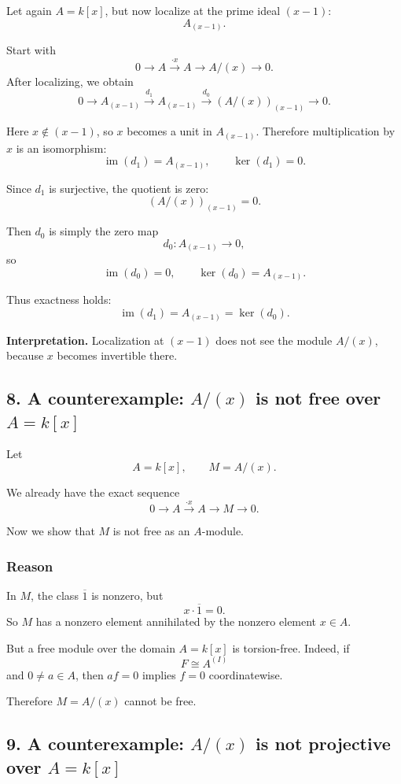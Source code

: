 \documentclass[12pt,a4paper]{article}
\theoremstyle{notespace}
\theoremstyle{definition}
\begin{document}
Let again \(A=k[x]\), but now localize at the prime ideal \((x-1)\):
\[
A_{(x-1)}.
\]

Start with
\[
0 \longrightarrow A \xrightarrow{\cdot x} A \longrightarrow A/(x) \longrightarrow 0.
\]
After localizing, we obtain
\[
0 \longrightarrow A_{(x-1)} \xrightarrow{d_1} A_{(x-1)} \xrightarrow{d_0} (A/(x))_{(x-1)} \longrightarrow 0.
\]

Here \(x\notin (x-1)\), so \(x\) becomes a unit in \(A_{(x-1)}\).
Therefore multiplication by \(x\) is an isomorphism:
\[
\operatorname{im}(d_1)=A_{(x-1)},
\qquad
\ker(d_1)=0.
\]

Since \(d_1\) is surjective, the quotient is zero:
\[
(A/(x))_{(x-1)}=0.
\]

Then \(d_0\) is simply the zero map
\[
d_0:A_{(x-1)}\to 0,
\]
so
\[
\operatorname{im}(d_0)=0,
\qquad
\ker(d_0)=A_{(x-1)}.
\]

Thus exactness holds:
\[
\operatorname{im}(d_1)=A_{(x-1)}=\ker(d_0).
\]

\medskip

\textbf{Interpretation.}
Localization at \((x-1)\) does not see the module \(A/(x)\), because \(x\) becomes invertible there.

\subsection{8. A counterexample: \(A/(x)\) is not free over \(A=k[x]\)}

Let
\[
A=k[x], \qquad M=A/(x).
\]

We already have the exact sequence
\[
0 \longrightarrow A \xrightarrow{\cdot x} A \longrightarrow M \longrightarrow 0.
\]

Now we show that \(M\) is not free as an \(A\)-module.

\subsubsection*{Reason}

In \(M\), the class \(\overline{1}\) is nonzero, but
\[
x\cdot \overline{1}=0.
\]
So \(M\) has a nonzero element annihilated by the nonzero element \(x\in A\).

But a free module over the domain \(A=k[x]\) is torsion-free.
Indeed, if
\[
F\cong A^{(I)}
\]
and \(0\neq a\in A\), then \(af=0\) implies \(f=0\) coordinatewise.

Therefore \(M=A/(x)\) cannot be free.

\subsection{9. A counterexample: \(A/(x)\) is not projective over \(A=k[x]\)}
\end{document}

